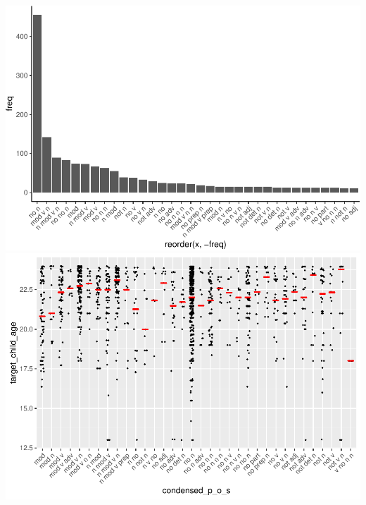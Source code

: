 \documentclass[man]{apa6}
\begin{document}
\includegraphics{negation_production_files/figure-latex/construction-1.pdf}
\includegraphics{negation_production_files/figure-latex/construction-2.pdf}
\end{document}
